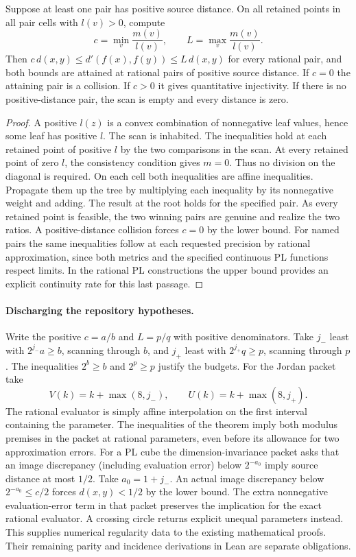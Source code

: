 \begin{theorem}\label{thm:pairratio}
Suppose at least one pair has positive source distance. On all retained points in all pair cells with $l(v)>0$, compute
\[
       c=\min_v\frac{m(v)}{l(v)},\qquad L=\max_v\frac{m(v)}{l(v)}.
\]
Then $c\,d(x,y)\le d'(f(x),f(y))\le L\,d(x,y)$ for every rational pair, and both bounds are attained at rational pairs of positive source distance. If $c=0$ the attaining pair is a collision. If $c>0$ it gives quantitative injectivity. If there is no positive-distance pair, the scan is empty and every distance is zero.
\end{theorem}
\begin{proof}
A positive $l(z)$ is a convex combination of nonnegative leaf values, hence some leaf has positive $l$. The scan is inhabited. The inequalities hold at each retained point of positive $l$ by the two comparisons in the scan. At every retained point of zero $l$, the consistency condition gives $m=0$. Thus no division on the diagonal is required. On each cell both inequalities are affine inequalities. Propagate them up the tree by multiplying each inequality by its nonnegative weight and adding. The result at the root holds for the specified pair. As every retained point is feasible, the two winning pairs are genuine and realize the two ratios. A positive-distance collision forces $c=0$ by the lower bound. For named pairs the same inequalities follow at each requested precision by rational approximation, since both metrics and the specified continuous PL functions respect limits. In the rational PL constructions the upper bound provides an explicit continuity rate for this last passage.
\end{proof}

\paragraph{Discharging the repository hypotheses.}
Write the positive $c=a/b$ and $L=p/q$ with positive denominators. Take $j_-$ least with $2^{j_-}a\ge b$, scanning through $b$, and $j_+$ least with $2^{j_+}q\ge p$, scanning through $p$. The inequalities $2^b\ge b$ and $2^p\ge p$ justify the budgets. For the Jordan packet take
\[
      V(k)=k+\max(8,j_-),\qquad U(k)=k+\max(8,j_+).
\]
The rational evaluator is simply affine interpolation on the first interval containing the parameter. The inequalities of the theorem imply both modulus premises in the packet at rational parameters, even before its allowance for two approximation errors. For a PL cube the dimension-invariance packet asks that an image discrepancy (including evaluation error) below $2^{-a_0}$ imply source distance at most $1/2$. Take $a_0=1+j_-$. An actual image discrepancy below $2^{-a_0}\le c/2$ forces $d(x,y)<1/2$ by the lower bound. The extra nonnegative evaluation-error term in that packet preserves the implication for the exact rational evaluator. A crossing circle returns explicit unequal parameters instead. This supplies numerical regularity data to the existing mathematical proofs. Their remaining parity and incidence derivations in Lean are separate obligations.

